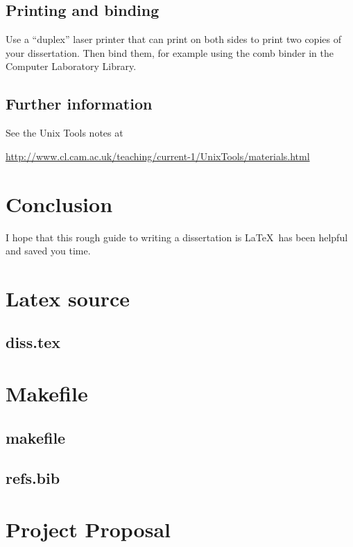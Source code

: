 \documentclass[12pt,a4paper,twoside,openright]{report}
\begin{document}
\section{Printing and binding}

Use a ``duplex'' laser printer that can print on both sides to print
two copies of your dissertation. Then bind them, for example using the
comb binder in the Computer Laboratory Library.

\section{Further information}

See the Unix Tools notes at

\url{http://www.cl.cam.ac.uk/teaching/current-1/UnixTools/materials.html}


\chapter{Conclusion}

I hope that this rough guide to writing a dissertation is \LaTeX\ has
been helpful and saved you time.




\appendix


\chapter{Latex source}

\section{diss.tex}
{\scriptsize}

\chapter{Makefile}

\section{makefile}\label{makefile}
{\scriptsize}

\section{refs.bib}
{\scriptsize}


\chapter{Project Proposal}


\end{document}
